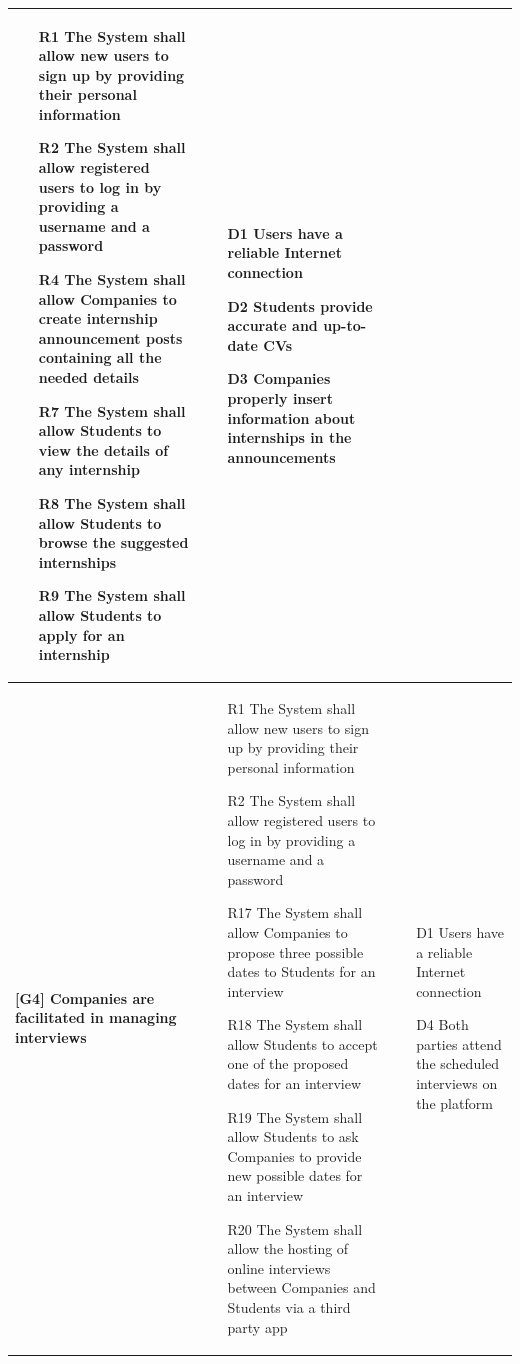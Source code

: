 \begin{longtable}{|p{4cm}|p{5.5cm}|p{5.5cm}|}
    \begin{itemize}[label=$\bullet$]
        \item [R1] The System shall allow new users to sign up by providing their personal information
        \item [R2] The System shall allow registered users to log in by providing a username and a password
        \item [R4] The System shall allow Companies to create internship announcement posts containing all the needed details
        \item [R7] The System shall allow Students to view the details of any internship
        \item [R8] The System shall allow Students to browse the suggested internships
        \item [R9] The System shall allow Students to apply for an internship
    \end{itemize}
    &
    \begin{itemize}[label=$\bullet$]
        \item [D1] Users have a reliable Internet connection
        \item [D2] Students provide accurate and up-to-date CVs
        \item [D3] Companies properly insert information about internships in the announcements
    \end{itemize} \\ 
    \hline

        \textbf{[G4] \newline Companies are facilitated in managing interviews} & 
    \begin{itemize}[label=$\bullet$]
        \item [R1] The System shall allow new users to sign up by providing their personal information
        \item [R2] The System shall allow registered users to log in by providing a username and a password
        \item [R17] The System shall allow Companies to propose three possible dates to Students for an interview
        \item [R18] The System shall allow Students to accept one of the proposed dates for an interview
        \item [R19] The System shall allow Students to ask Companies to provide new possible dates for an interview
        \item [R20] The System shall allow the hosting of online interviews between Companies and Students via a third party app
    \end{itemize}
    &
    \begin{itemize}[label=$\bullet$]
        \item [D1] Users have a reliable Internet connection
        \item [D4] Both parties attend the scheduled interviews on the platform
    \end{itemize} \\ 
    \hline


\end{longtable}
